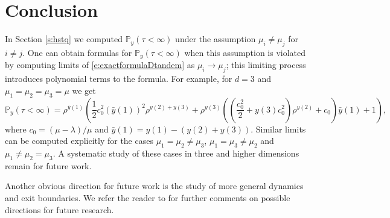 \documentclass[11pt,a4paper]{article}
\begin{document}
\section{Conclusion}\label{s:conclusion}
In Section \ref{s:hstq} we computed ${\mathbb P}_y(\tau < \infty)$
under the assumption $\mu_i \neq \mu_j$ for $i\neq j.$
One can obtain formulas for ${\mathbb P}_y(\tau < \infty)$ when
this assumption is violated by computing limits
of \eqref{e:exactformulaDtandem} as $\mu_i \rightarrow \mu_j$; this
limiting process introduces polynomial terms to the formula. 
For example, for $d=3$ and
$\mu_1 = \mu_2 = \mu_3=\mu$ we get
\[
{\mathbb P}_y(\tau < \infty) 
= \rho^{\bar{y}(1)}
\left(
\frac{1}{2}c_0^2 (\bar{y}(1))^2 \rho^{y(2)+y(3)}
+  \rho^{y(3)} \left( \left( \frac{c_0^2}{2} + y(3) c_0^2 \right) 
\rho^{y(2)} + c_0\right) \bar{y}(1) +1 \right),
\]
where $c_0 = (\mu - \lambda)/\mu$
and $\bar{y}(1) = y(1) -( y(2) + y(3))$.
Similar limits can be computed explicitly for the cases
$\mu_1 = \mu_2 \neq \mu_3$, $\mu_1=\mu_3 \neq \mu_2$ and
$\mu_1 \neq \mu_2  = \mu_3$.
A systematic study of these cases in three and higher dimensions 
remain for future work.

Another obvious direction for future work is the study of more
general dynamics and exit boundaries. We refer the reader
to \cite[Conclusion]{sezer2018approximation} for further comments
on possible directions for future research.


















\end{document}
